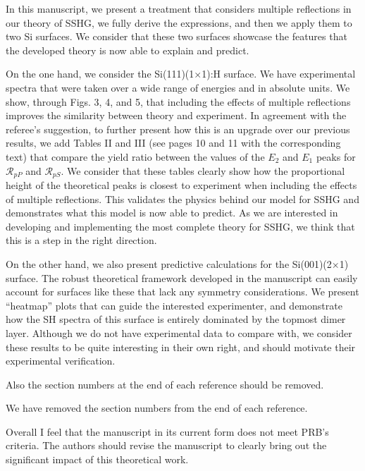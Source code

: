 \documentclass[11pt]{article}
\begin{document}
\begin{shaded}
In this manuscript, we present a treatment that considers multiple reflections
in our theory of SSHG, we fully derive the expressions, and then we apply them
to two Si surfaces. We consider that these two surfaces showcase the features
that the developed theory is now able to explain and predict.

On the one hand, we consider the Si(111)(1$\times$1):H surface. We have
experimental spectra that were taken over a wide range of energies and in
absolute units. We show, through Figs. 3, 4, and 5, that including the effects
of multiple reflections improves the similarity between theory and experiment.
In agreement with the referee's suggestion, to further present how this is an
upgrade over our previous results, we add Tables II and III (see pages 10 and 11
with the corresponding text) that compare the yield ratio between the values of
the $E_{2}$ and $E_{1}$ peaks for $\mathcal{R}_{pP}$ and $\mathcal{R}_{pS}$. We
consider that these tables clearly show how the proportional height of the
theoretical peaks is closest to experiment when including the effects of
multiple reflections. This validates the physics behind our model for SSHG and
demonstrates what this model is now able to predict. As we are interested in
developing and implementing the most complete theory for SSHG, we think that
this is a step in the right direction.

On the other hand, we also present predictive calculations for the
Si(001)(2$\times$1) surface. The robust theoretical framework developed in the
manuscript can easily account for surfaces like these that lack any symmetry
considerations. We present ``heatmap'' plots that can guide the interested
experimenter, and demonstrate how the SH spectra of this surface is entirely
dominated by the topmost dimer layer. Although we do not have experimental data
to compare with, we consider these results to be quite interesting in their own
right, and should motivate their experimental verification.
\end{shaded}

Also the section numbers at the end of each reference should be removed.
\begin{shaded}
We have removed the section numbers from the end of each reference.
\end{shaded}

Overall I feel that the manuscript in its current form does not meet PRB's
criteria. The authors should revise the manuscript to clearly bring out the
significant impact of this theoretical work.
\end{document}
